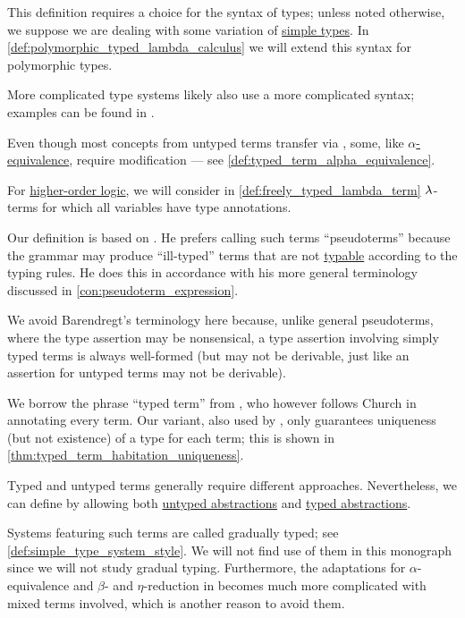 \begin{comments}
  \item This definition requires a choice for the syntax of types; unless noted otherwise, we suppose we are dealing with some variation of \hyperref[def:simple_type]{simple types}. In \cref{def:polymorphic_typed_lambda_calculus} we will extend this syntax for polymorphic types.

  More complicated type systems likely also use a more complicated syntax; examples can be found in .

  \item Even though most concepts from untyped terms transfer via , some, like \hyperref[def:lambda_term_alpha_equivalence]{\( \alpha \)-equivalence}, require modification --- see \cref{def:typed_term_alpha_equivalence}.

  \item For \hyperref[def:simply_typed_hol]{higher-order logic}, we will consider in \cref{def:freely_typed_lambda_term} \( {\mathrm \lambda} \)-terms for which all variables have type annotations.

  \item Our definition is based on . He prefers calling such terms \enquote{pseudoterms} because the grammar may produce \enquote{ill-typed} terms that are not \hyperref[def:typability]{typable} according to the typing rules. He does this in accordance with his more general terminology discussed in \cref{con:pseudoterm_expression}.

  We avoid Barendregt's terminology here because, unlike general pseudoterms, where the type assertion may be nonsensical, a type assertion involving simply typed terms is always well-formed (but may not be derivable, just like an assertion for untyped terms may not be derivable).

  We borrow the phrase \enquote{typed term} from , who however follows Church in annotating every term. Our variant, also used by , only guarantees uniqueness (but not existence) of a type for each term; this is shown in \cref{thm:typed_term_habitation_uniqueness}.
\end{comments}

\begin{remark}\label{rem:mixed_lambda_term}\mimprovised
  Typed and untyped terms generally require different approaches. Nevertheless, we can define  by allowing both \hyperref[def:lambda_term]{untyped abstractions} and \hyperref[def:typed_lambda_term]{typed abstractions}.

  Systems featuring such terms are called gradually typed; see \cref{def:simple_type_system_style}. We will not find use of them in this monograph since we will not study gradual typing. Furthermore, the adaptations for \( \alpha \)-equivalence and \( \beta \)- and \( \eta \)-reduction in  becomes much more complicated with mixed terms involved, which is another reason to avoid them.
\end{remark}

